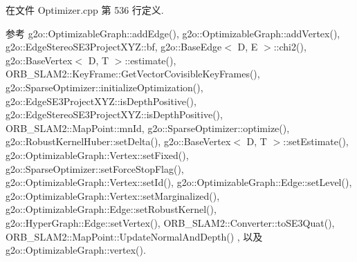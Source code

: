 在文件 Optimizer.\-cpp 第 536 行定义.



参考 g2o\-::\-Optimizable\-Graph\-::add\-Edge(), g2o\-::\-Optimizable\-Graph\-::add\-Vertex(), g2o\-::\-Edge\-Stereo\-S\-E3\-Project\-X\-Y\-Z\-::bf, g2o\-::\-Base\-Edge$<$ D, E $>$\-::chi2(), g2o\-::\-Base\-Vertex$<$ D, T $>$\-::estimate(), O\-R\-B\-\_\-\-S\-L\-A\-M2\-::\-Key\-Frame\-::\-Get\-Vector\-Covisible\-Key\-Frames(), g2o\-::\-Sparse\-Optimizer\-::initialize\-Optimization(), g2o\-::\-Edge\-S\-E3\-Project\-X\-Y\-Z\-::is\-Depth\-Positive(), g2o\-::\-Edge\-Stereo\-S\-E3\-Project\-X\-Y\-Z\-::is\-Depth\-Positive(), O\-R\-B\-\_\-\-S\-L\-A\-M2\-::\-Map\-Point\-::mn\-Id, g2o\-::\-Sparse\-Optimizer\-::optimize(), g2o\-::\-Robust\-Kernel\-Huber\-::set\-Delta(), g2o\-::\-Base\-Vertex$<$ D, T $>$\-::set\-Estimate(), g2o\-::\-Optimizable\-Graph\-::\-Vertex\-::set\-Fixed(), g2o\-::\-Sparse\-Optimizer\-::set\-Force\-Stop\-Flag(), g2o\-::\-Optimizable\-Graph\-::\-Vertex\-::set\-Id(), g2o\-::\-Optimizable\-Graph\-::\-Edge\-::set\-Level(), g2o\-::\-Optimizable\-Graph\-::\-Vertex\-::set\-Marginalized(), g2o\-::\-Optimizable\-Graph\-::\-Edge\-::set\-Robust\-Kernel(), g2o\-::\-Hyper\-Graph\-::\-Edge\-::set\-Vertex(), O\-R\-B\-\_\-\-S\-L\-A\-M2\-::\-Converter\-::to\-S\-E3\-Quat(), O\-R\-B\-\_\-\-S\-L\-A\-M2\-::\-Map\-Point\-::\-Update\-Normal\-And\-Depth() , 以及 g2o\-::\-Optimizable\-Graph\-::vertex().



